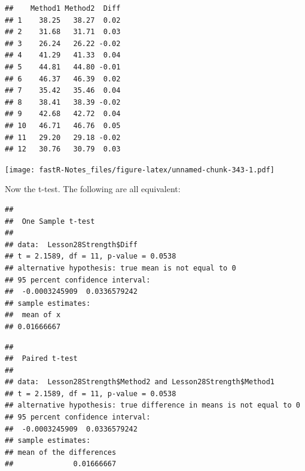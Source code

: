 \documentclass[]{book}
\newenvironment{Shaded}{\begin{snugshade}}{\end{snugshade}}
\newcommand{\KeywordTok}[1]{\textcolor[rgb]{0.13,0.29,0.53}{\textbf{#1}}}
\newcommand{\DataTypeTok}[1]{\textcolor[rgb]{0.13,0.29,0.53}{#1}}
\newcommand{\DecValTok}[1]{\textcolor[rgb]{0.00,0.00,0.81}{#1}}
\newcommand{\OperatorTok}[1]{\textcolor[rgb]{0.81,0.36,0.00}{\textbf{#1}}}
\newcommand{\NormalTok}[1]{#1}
\theoremstyle{definition}
\theoremstyle{definition}
\theoremstyle{definition}
\theoremstyle{remark}
\begin{document}
\begin{verbatim}
##    Method1 Method2  Diff
## 1    38.25   38.27  0.02
## 2    31.68   31.71  0.03
## 3    26.24   26.22 -0.02
## 4    41.29   41.33  0.04
## 5    44.81   44.80 -0.01
## 6    46.37   46.39  0.02
## 7    35.42   35.46  0.04
## 8    38.41   38.39 -0.02
## 9    42.68   42.72  0.04
## 10   46.71   46.76  0.05
## 11   29.20   29.18 -0.02
## 12   30.76   30.79  0.03
\end{verbatim}

\begin{Shaded}
\end{Shaded}

\texttt{[image: fastR-Notes\_files/figure-latex/unnamed-chunk-343-1.pdf]}

Now the t-test. The following are all equivalent:

\begin{Shaded}
\end{Shaded}

\begin{verbatim}
## 
##  One Sample t-test
## 
## data:  Lesson28Strength$Diff
## t = 2.1589, df = 11, p-value = 0.0538
## alternative hypothesis: true mean is not equal to 0
## 95 percent confidence interval:
##  -0.0003245909  0.0336579242
## sample estimates:
##  mean of x 
## 0.01666667
\end{verbatim}

\begin{Shaded}
\end{Shaded}

\begin{verbatim}
## 
##  Paired t-test
## 
## data:  Lesson28Strength$Method2 and Lesson28Strength$Method1
## t = 2.1589, df = 11, p-value = 0.0538
## alternative hypothesis: true difference in means is not equal to 0
## 95 percent confidence interval:
##  -0.0003245909  0.0336579242
## sample estimates:
## mean of the differences 
##              0.01666667
\end{verbatim}
\end{document}
